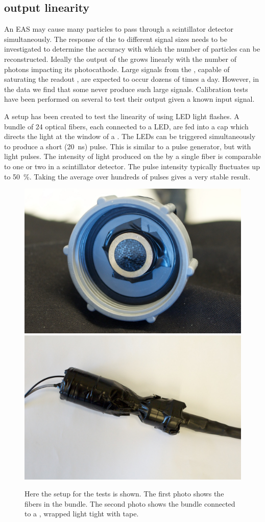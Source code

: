 \subsection{\pmt output linearity}
\label{sub:pmt_linearity}

An EAS may cause many particles to pass through a scintillator detector simultaneously. The response of the \pmt to different signal sizes needs to be investigated to determine the accuracy with which the number of particles can be reconstructed. Ideally the output of the \pmt grows linearly with the number of photons impacting its photocathode. Large signals from the \pmt, capable of saturating the readout \adcs, are expected to occur dozens of times a day. However, in the data we find that some \pmts never produce such large signals. Calibration tests have been performed on several \pmts to test their output given a known input signal.

A setup has been created to test the linearity of \pmts using LED light flashes. A bundle of 24 optical fibers, each connected to a LED, are fed into a cap which directs the light at the window of a \pmt. The LEDs can be triggered simultaneously to produce a short (\SI{20}{\ns}) pulse. This is similar to a pulse generator, but with light pulses. The intensity of light produced on the \pmt by a single fiber is comparable to one or two \mip in a scintillator detector. The \pmt pulse intensity typically fluctuates up to \SI{50}{\percent}. Taking the average over hundreds of pulses gives a very stable result.

\begin{figure}
    \centering
    \includegraphics[width=0.45\linewidth]{plots/station/ARN_085351.jpg}
    \includegraphics[width=0.45\linewidth]{plots/station/ARN_085349.jpg}
    \caption{Here the setup for the \pmt tests is shown. The first photo shows the fibers in the bundle. The second photo shows the bundle connected to a \nikhef \pmt, wrapped light tight with tape.}
    \label{fig:pmt_test_setup}
\end{figure}

